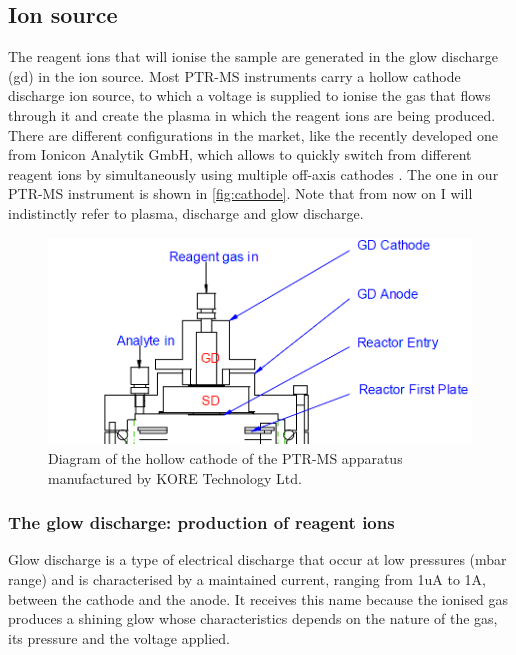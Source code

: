 \subsection{Ion source}
The reagent ions that will ionise the sample are generated in the glow discharge (\acrshort{gd}) %
in the ion source. Most PTR-MS instruments carry a hollow cathode discharge ion source, to which a voltage is supplied to ionise the gas that flows through it and create the plasma in which the reagent ions are being produced.
There are different configurations in the market, like the recently developed one from Ionicon Analytik GmbH, which allows to quickly switch from different reagent ions by simultaneously using multiple off-axis cathodes \cite{lanza2015selective}. The one in our PTR-MS instrument is shown in \autoref{fig:cathode}.
Note that from now on I will indistinctly refer to plasma, discharge and glow discharge.






\begin{figure}[t]
\centering
\includegraphics[width=0.6\linewidth]{pics/cathode.png}
\centering
\caption{Diagram of the hollow cathode of the PTR-MS apparatus manufactured by KORE Technology Ltd.}
\label{fig:cathode}
\end{figure}








\subsubsection{The glow discharge: production of reagent ions}
Glow discharge is a type of electrical discharge that occur at low pressures (mbar range) and is characterised by a maintained current, ranging from 1uA to 1A, between the cathode and the anode. It receives this name because the ionised gas produces a shining glow whose characteristics depends on the nature of the gas, its pressure and the voltage applied.


